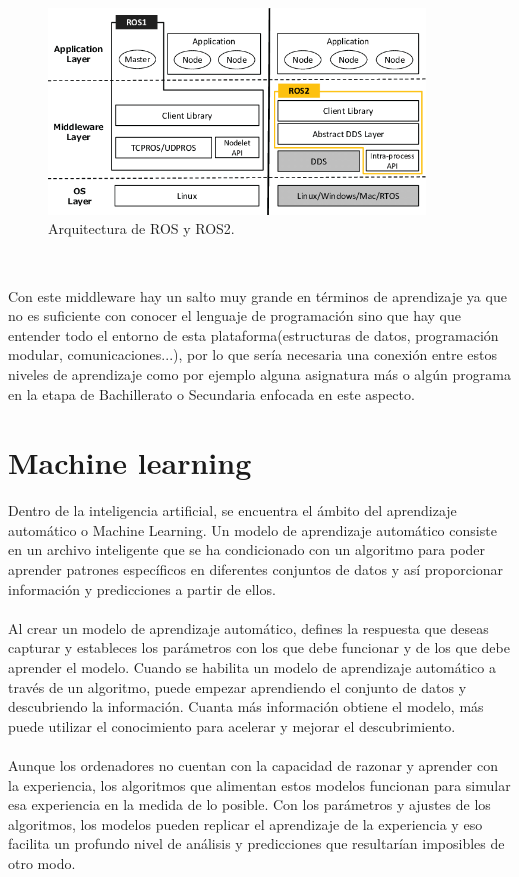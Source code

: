 \begin{figure} [h!]
  \begin{center}
    \includegraphics[width=10cm]{figs/ros.png}
  \end{center}
  \caption{Arquitectura de ROS y ROS2.}
  \label{fig:ros}
\end{figure}\

Con este middleware hay un salto muy grande en términos de aprendizaje ya que no es suficiente con conocer el lenguaje de programación sino que hay que entender todo el entorno de esta plataforma(estructuras de datos, programación modular, comunicaciones...), por lo que sería necesaria una conexión entre estos niveles de aprendizaje como por ejemplo alguna asignatura más o algún programa en la etapa de Bachillerato o Secundaria enfocada en este aspecto.


\section{Machine learning}


Dentro de la inteligencia artificial, se encuentra el ámbito del aprendizaje automático o Machine Learning. Un modelo de aprendizaje automático consiste en un archivo inteligente que se ha condicionado con un algoritmo para poder aprender patrones específicos en diferentes conjuntos de datos y así proporcionar información y predicciones a partir de ellos.\\ \\ Al crear un modelo de aprendizaje automático, defines la respuesta que deseas capturar y estableces los parámetros con los que debe funcionar y de los que debe aprender el modelo. Cuando se habilita un modelo de aprendizaje automático a través de un algoritmo, puede empezar aprendiendo el conjunto de datos y descubriendo la información. Cuanta más información obtiene el modelo, más puede utilizar el conocimiento para acelerar y mejorar el descubrimiento.\\ \\Aunque los ordenadores no cuentan con la capacidad de razonar y aprender con la experiencia, los algoritmos que alimentan estos modelos funcionan para simular esa experiencia en la medida de lo posible. Con los parámetros y ajustes de los algoritmos, los modelos pueden replicar el aprendizaje de la experiencia y eso facilita un profundo nivel de análisis y predicciones que resultarían imposibles de otro modo. \\

